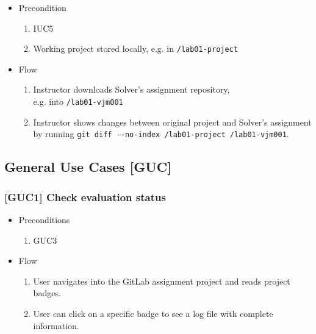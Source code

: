 \begin{itemize}
\item
  {Precondition}
    \begin{enumerate}
    \item
      {IUC5}
    \item
      {Working project stored locally, e.g. in \texttt{\textapprox/lab01-project}}
    \end{enumerate}
\end{itemize}

\begin{itemize}
\item
  {Flow}
    \begin{enumerate}
    \item
      {Instructor downloads Solver's assignment repository, \\ e.g. into \texttt{\textapprox/lab01-vjm001}}
    \item
      {Instructor shows changes between original project and Solver's assignment by running \texttt{git diff -\/-no-index \textapprox/lab01-project \textapprox/lab01-vjm001}.}
    \end{enumerate}
\end{itemize}

\subsection{General Use Cases {[}GUC{]}} \label{ssec:guc}

\subsubsection{{[}GUC1{]} Check evaluation status}

\begin{itemize}
\item
  {Preconditions}
    \begin{enumerate}
    \item
      {GUC3}
    \end{enumerate}
\end{itemize}

\begin{itemize}
\item
  {Flow}
    \begin{enumerate}
    \item
      {User navigates into the GitLab assignment project and reads project bad\-ges.}
    \item
      {User can click on a specific badge to see a log file with complete information.}
    \end{enumerate}
\end{itemize}

